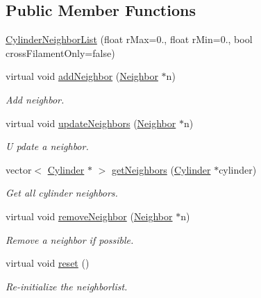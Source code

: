 \subsection*{Public Member Functions}
\begin{DoxyCompactItemize}
\item 
\hyperlink{classCylinderNeighborList_aef6a9762e56f41eb93df24a56b20bd1b}{Cylinder\+Neighbor\+List} (float r\+Max=0., float r\+Min=0., bool cross\+Filament\+Only=false)
\item 
virtual void \hyperlink{classCylinderNeighborList_a82f842d817bd85b787b7bca22df6ddb8}{add\+Neighbor} (\hyperlink{classNeighbor}{Neighbor} $\ast$n)
\begin{DoxyCompactList}\small\item\em Add neighbor. \end{DoxyCompactList}\item 
virtual void \hyperlink{classCylinderNeighborList_a79ecfe8beb43a0e8e41534ab1c04083b}{update\+Neighbors} (\hyperlink{classNeighbor}{Neighbor} $\ast$n)
\begin{DoxyCompactList}\small\item\em U pdate a neighbor. \end{DoxyCompactList}\item 
vector$<$ \hyperlink{classCylinder}{Cylinder} $\ast$ $>$ \hyperlink{classCylinderNeighborList_a7b0ff8157bd8c81893b868db2512a6a0}{get\+Neighbors} (\hyperlink{classCylinder}{Cylinder} $\ast$cylinder)
\begin{DoxyCompactList}\small\item\em Get all cylinder neighbors. \end{DoxyCompactList}\item 
virtual void \hyperlink{classNeighborList_aa64ee01bc18598fae6906ca6d5dcc7d6}{remove\+Neighbor} (\hyperlink{classNeighbor}{Neighbor} $\ast$n)
\begin{DoxyCompactList}\small\item\em Remove a neighbor if possible. \end{DoxyCompactList}\item 
virtual void \hyperlink{classNeighborList_a93a07ead9349edba7d763b483ec42847}{reset} ()
\begin{DoxyCompactList}\small\item\em Re-\/initialize the neighborlist. \end{DoxyCompactList}\end{DoxyCompactItemize}
